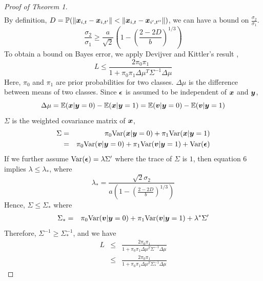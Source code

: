 \documentclass{article}
\begin{document}
\begin{proof}[Proof of Theorem 1]
\begin{eqnarray*}
	\end{eqnarray*}
	By definition, $D=\mathbb{P}(\|\boldsymbol{x}_{i,t}-\boldsymbol{x}_{i,t'}\|<\|\boldsymbol{x}_{i,t}-\boldsymbol{x}_{i',t''}\|)$, we can have a bound on $\frac{ \sigma_2}{\sigma_1}$.
	\begin{equation}
	\frac{ \sigma_2}{\sigma_1} \geq\frac{a}{\sqrt{2}} (1-(\frac{2-2D}{b})^{1/3} )
	\end{equation}	
	To obtain a bound on Bayes error, we apply Devijver and Kittler's result \cite{devijver1982pattern},
	\[L \leq \frac{2\pi_0\pi_1}{1+\pi_0\pi_1\Delta\mu^T\Sigma^{-1}\Delta\mu}\]
	Here, $\pi_0$ and $\pi_1$ are prior probabilities for two classes. $\Delta\mu$ is the difference between means of two classes. Since $\boldsymbol{\epsilon}$ is assumed to be independent of $\boldsymbol{x}$ and $\boldsymbol{y}$,
	\[\Delta\mu= \mathbb{E}(\boldsymbol{x}|\boldsymbol{y}=0)-\mathbb{E}(\boldsymbol{x}|\boldsymbol{y}=1)=\mathbb{E}(\boldsymbol{v}|\boldsymbol{y}=0)-\mathbb{E}(\boldsymbol{v}|\boldsymbol{y}=1)\]
	$\Sigma$ is the weighted covariance matrix of $\boldsymbol{x}$,
	\begin{eqnarray*}
		\Sigma &=& \pi_0\text{Var}(\boldsymbol{x}|\boldsymbol{y}=0)+\pi_1\text{Var}(\boldsymbol{x}|\boldsymbol{y}=1)\\
		&=& \pi_0\text{Var}(\boldsymbol{v}|\boldsymbol{y}=0)+\pi_1\text{Var}(\boldsymbol{v}|\boldsymbol{y}=1)+\text{Var}(\boldsymbol{\epsilon}) \\ 
	\end{eqnarray*}
	If we further assume $\text{Var}(\boldsymbol{\epsilon}) = \lambda \Sigma'$ where the trace of $\Sigma$ is $1$, then equation 6 implies $\lambda\leq\lambda_*$, where
	\[\lambda_*=\frac{\sqrt{2}\sigma_2}{a(1-(\frac{2-2D}{b})^{1/3} )}\]
	Hence, 	$\Sigma \leq \Sigma_*$ where
	\begin{eqnarray*}
		\Sigma_*&=& \pi_0\text{Var}(\boldsymbol{v}|\boldsymbol{y}=0)+\pi_1\text{Var}(\boldsymbol{v}|\boldsymbol{y}=1)+\lambda^*\Sigma'
	\end{eqnarray*}
	Therefore, $\Sigma^{-1} \geq \Sigma_*^{-1}$, and we have
	\begin{eqnarray*}
		L &\leq& \frac{2\pi_0\pi_1}{1+\pi_0\pi_1\Delta\mu^T\Sigma^{-1}\Delta\mu} \\
		&\leq& \frac{2\pi_0\pi_1}{1+\pi_0\pi_1\Delta\mu^T\Sigma_*^{-1}\Delta\mu}
	\end{eqnarray*}
\end{proof}
\end{document}
